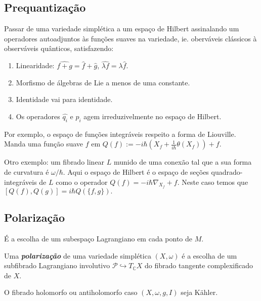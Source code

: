 \subsection{Prequantização}

Passar de uma variedade simplética a um espaço de Hilbert assinalando um operadores autoadjuntos às funções suaves na variedade, ie. oberváveis clássicos à observáveis quânticos, satisfazendo:
\begin{enumerate}
	\item Linearidade: $\hat{f+g}=\hat{f}+\hat{g}$, $\hat{\lambda f}=\lambda\hat{f}$.
	\item Morfismo de álgebras de Lie a menos de uma constante.
	\item Identidade vai para identidade.
	\item Os operadores $\hat{q_i}$ e $\hat{p_i}$ agem irreduzivelmente no espaço de Hilbert.
\end{enumerate}


Por exemplo, o espaço de funções integráveis respeito a forma de Liouville. Manda uma função suave $f$ em $Q(f):=-i\hbar \left( X_f+\frac{1}{i\hbar}\theta(X_f) \right) +f$.

Otro exemplo: um fibrado linear $L$ munido de uma conexão tal que a sua forma de curvatura é $ \omega /\hbar$. Aqui o espaço de Hilbert é o espaço de seções quadrado-integráveis de $L$ como o operador $Q(f)=-i\hbar \nabla_{X_f}+f$. Neste caso temos que $[Q(f),Q(g)]=i\hbar Q(\{f,g\}).$

\subsection{Polarização}

É a escolha de um subespaço Lagrangiano em cada ponto de $M$.

\begin{defn}
	Uma \textit{\textbf{polarização}} de uma variedade simplética $(X,\omega )$ é a escolha de um subfibrado Lagrangiano involutivo $\mathcal{P}\hookrightarrow T_{\mathbb{C}}X$ do fibrado tangente complexificado de $X$.
\end{defn}

\begin{example}
	O fibrado holomorfo ou antiholomorfo caso $(X,\omega,g,I)$ seja K\"ahler.
\end{example}


